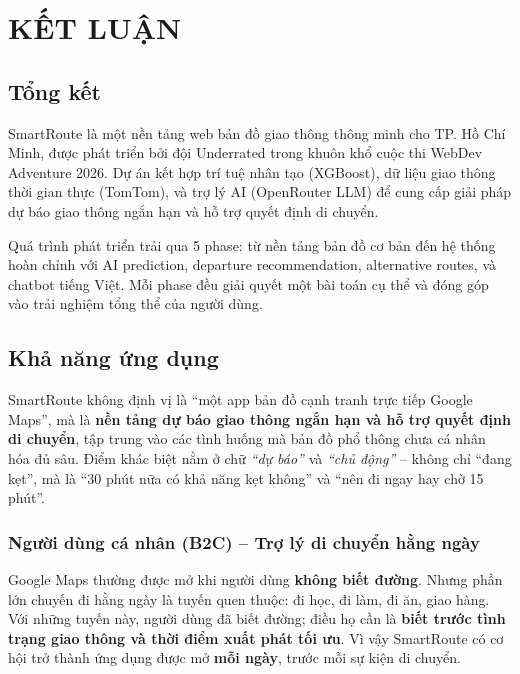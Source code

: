 \documentclass[12pt,a4paper]{article}
\begin{document}
\section{KẾT LUẬN}

\subsection{Tổng kết}
SmartRoute là một nền tảng web bản đồ giao thông thông minh cho TP. Hồ Chí Minh, được phát triển bởi đội Underrated trong khuôn khổ cuộc thi WebDev Adventure 2026. Dự án kết hợp trí tuệ nhân tạo (XGBoost), dữ liệu giao thông thời gian thực (TomTom), và trợ lý AI (OpenRouter LLM) để cung cấp giải pháp dự báo giao thông ngắn hạn và hỗ trợ quyết định di chuyển.

Quá trình phát triển trải qua 5 phase: từ nền tảng bản đồ cơ bản đến hệ thống hoàn chỉnh với AI prediction, departure recommendation, alternative routes, và chatbot tiếng Việt. Mỗi phase đều giải quyết một bài toán cụ thể và đóng góp vào trải nghiệm tổng thể của người dùng.

\subsection{Khả năng ứng dụng}

SmartRoute không định vị là ``một app bản đồ cạnh tranh trực tiếp Google Maps'', mà là \textbf{nền tảng dự báo giao thông ngắn hạn và hỗ trợ quyết định di chuyển}, tập trung vào các tình huống mà bản đồ phổ thông chưa cá nhân hóa đủ sâu. Điểm khác biệt nằm ở chữ \textit{``dự báo''} và \textit{``chủ động''} -- không chỉ ``đang kẹt'', mà là ``30 phút nữa có khả năng kẹt không'' và ``nên đi ngay hay chờ 15 phút''.

\subsubsection{Người dùng cá nhân (B2C) -- Trợ lý di chuyển hằng ngày}
Google Maps thường được mở khi người dùng \textbf{không biết đường}. Nhưng phần lớn chuyến đi hằng ngày là tuyến quen thuộc: đi học, đi làm, đi ăn, giao hàng. Với những tuyến này, người dùng đã biết đường; điều họ cần là \textbf{biết trước tình trạng giao thông và thời điểm xuất phát tối ưu}. Vì vậy SmartRoute có cơ hội trở thành ứng dụng được mở \textbf{mỗi ngày}, trước mỗi sự kiện di chuyển.
\end{document}
